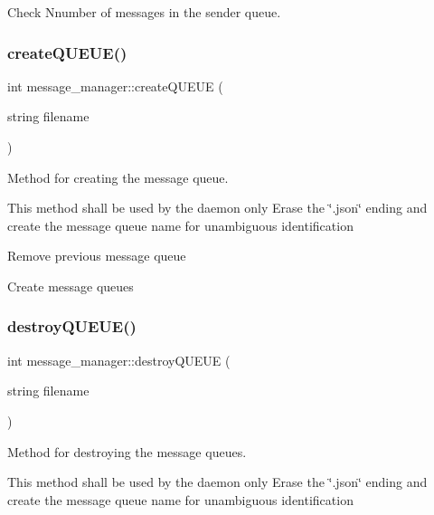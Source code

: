 Check Nnumber of messages in the sender queue. 

\mbox{\label{classmessage__manager_a63f1f841de93a791c5520f64ff797639}} 
\subsubsection{\texorpdfstring{create\+Q\+U\+E\+U\+E()}{createQUEUE()}}
{\footnotesize\ttfamily int message\+\_\+manager\+::create\+Q\+U\+E\+UE (\begin{DoxyParamCaption}\item[{string}]{filename }\end{DoxyParamCaption})}



Method for creating the message queue. 

This method shall be used by the daemon only Erase the \char`\"{}.\+json\char`\"{} ending and create the message queue name for unambiguous identification

Remove previous message queue

Create message queues \mbox{\label{classmessage__manager_ad6d2784240bffb39dc7e2dae9d6b0751}} 
\subsubsection{\texorpdfstring{destroy\+Q\+U\+E\+U\+E()}{destroyQUEUE()}}
{\footnotesize\ttfamily int message\+\_\+manager\+::destroy\+Q\+U\+E\+UE (\begin{DoxyParamCaption}\item[{string}]{filename }\end{DoxyParamCaption})}



Method for destroying the message queues. 

This method shall be used by the daemon only Erase the \char`\"{}.\+json\char`\"{} ending and create the message queue name for unambiguous identification \mbox{\label{classmessage__manager_a44006bd0a6a168cb40a81dcb1b81aaeb}} 
